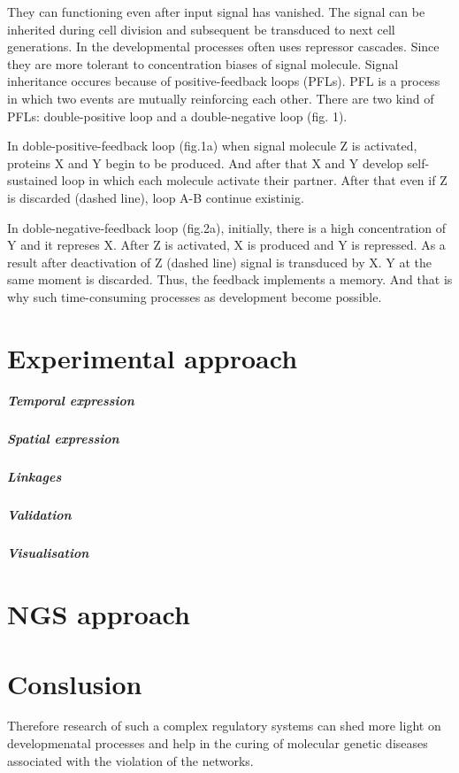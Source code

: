 \documentclass[a4paper, twoside]{report}
\begin{document}
They can functioning even after input signal has vanished.
The signal can be inherited during cell division and subsequent be transduced to next cell generations.
In the developmental processes often uses repressor cascades.
Since they are more tolerant to concentration biases of signal molecule.
Signal inheritance occures because of positive-feedback loops (PFLs).
PFL is a process in which two events are mutually reinforcing each other.
There are two kind of PFLs: double-positive loop and a double-negative loop (fig. 1).

In doble-positive-feedback loop (fig.1a) when signal molecule Z is activated, proteins X and Y begin to be produced. 
And after that X and Y develop self-sustained loop in which each molecule activate their partner.
After that even if Z is discarded (dashed line), loop A-B continue existinig.

In doble-negative-feedback loop (fig.2a), initially, there is a high concentration of Y and it represes X.
After Z is activated, X is produced and Y is repressed.
As a result after deactivation of Z (dashed line) signal is transduced by X.
Y at the same moment is discarded.
Thus, the feedback implements a memory.
And that is why such time-consuming processes as development become possible. 

\section*{Experimental approach}



\subparagraph{Temporal expression}

\subparagraph{Spatial expression}

\subparagraph{Linkages}

\subparagraph{Validation}

\subparagraph{Visualisation}

\section*{NGS approach}

\section*{Conslusion}


Therefore research of such a complex regulatory systems can shed more light on developmenatal processes and help in the curing of molecular genetic diseases associated with the violation of the networks.
\end{document}
